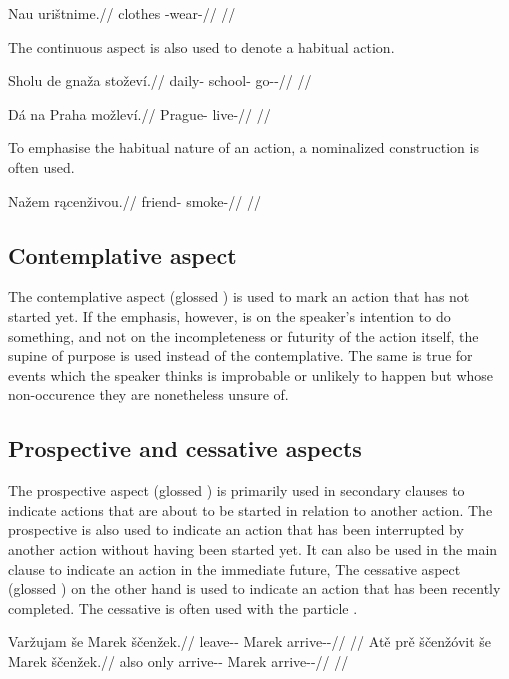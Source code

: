 \pex
\begingl
\gla Nau urištnime.//
\glb clothes \Refl{}-wear-//
\glft {} //
\endgl
\xe

The continuous aspect is also used to denote a habitual action.

\pex
\begingl
\gla Sholu de gnaža stoževí.//
\glb daily-\Ins{}  school-\Acc{} go-\Av{}-\Cont{}//
\glft {} //
\endgl
\xe

\pex
\begingl
\gla Dá na Praha možleví.//
\glb {} \Loc{} Prague-\Acc{} live-//
\glft {} //
\endgl
\xe

To emphasise the habitual nature of an action, a nominalized construction is
often used.

\pex
\begingl
\gla Nažem rącenživou.//
\glb friend-\First{}\Sg{} smoke-//
\glft {} //
\endgl
\xe


\subsection{Contemplative aspect}

The contemplative aspect (glossed \Ctp{}) is used to mark an action that has not
started yet. If the emphasis, however, is on the speaker's intention to do
something, and not on the incompleteness or futurity of the action itself, the
supine of purpose is used instead of the contemplative. The same is true for
events which the speaker thinks is improbable or unlikely to happen but whose
non-occurence they are nonetheless unsure of.

\subsection{Prospective and cessative aspects}

The prospective aspect (glossed \Prosp{}) is primarily used in secondary clauses
to indicate actions that are about to be started in relation to another action.
The prospective is also used to indicate an action that has been interrupted by
another action without having been started yet. It can also be used in the main
clause to indicate an action in the immediate future, The cessative aspect
(glossed \Ces{}) on the other hand is used to indicate an action that has been
recently completed. The cessative is often used with the particle
.

\pex
\a\begingl
\gla Varžujam še Marek ščenžek.//
\glb leave-\Av{}-\Prosp{} \Com{} Marek arrive-\Av{}-\Pf{}//
\glft {} //
\endgl
\a\begingl
\gla Atě prě ščenžóvit še Marek ščenžek.//
\glb also only arrive-\Av{}-\Ces{} \Com{} Marek arrive-\Av{}-\Pf{}//
\glft {} //
\endgl
\xe


